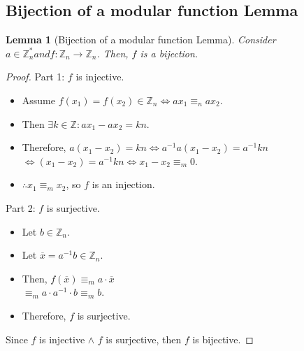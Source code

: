 \documentclass[12pt, a4paper, english]{report}
\newtheorem{lemma}{Lemma}
\begin{document}
\subsection{Bijection of a modular function Lemma}
\begin{lemma}[Bijection of a modular function Lemma]
    Consider $a \in \mathbb{Z}_{n}^{*} and f: \mathbb{Z}_{n} \rightarrow \mathbb{Z}_{n}$.\newline
    Then, $f$ is a bijection.\newline
\end{lemma}
\begin{proof}
    Part 1: $f$ is injective.\newline
    \begin{itemize}
        \item Assume $f(x_{1}) = f(x_{2}) \in \mathbb{Z}_{n} \iff ax_{1} \equiv_{n} ax_{2}$.
        \item Then $\exists k \in \mathbb{Z}: ax_{1} - ax_{2} = kn$.
        \item Therefore, $a(x_{1} - x_{2}) = kn \iff a^{-1}a(x_{1} - x_{2}) = a^{-1}kn$\\
        $\iff (x_{1} - x_{2}) = a^{-1}kn \iff x_{1} - x_{2} \equiv_{m} 0$.
        \item $\therefore x_{1} \equiv_{m} x_{2}$, so $f$ is an injection.
    \end{itemize}
    Part 2: $f$ is surjective.
    \begin{itemize}
        \item Let $b \in \mathbb{Z}_{n}$.
        \item Let $\overline{x} = a^{-1}b \in \mathbb{Z}_{n}$.
        \item Then, $f(\overline{x}) \equiv_{m} a \cdot \overline{x}$\\
        $\equiv_{m} a \cdot a^{-1} \cdot b \equiv_{m} b$.
        \item Therefore, $f$ is surjective.
    \end{itemize}
    Since $f$ is injective $\land$ $f$ is surjective, then $f$ is bijective.
\end{proof}
\end{document}
